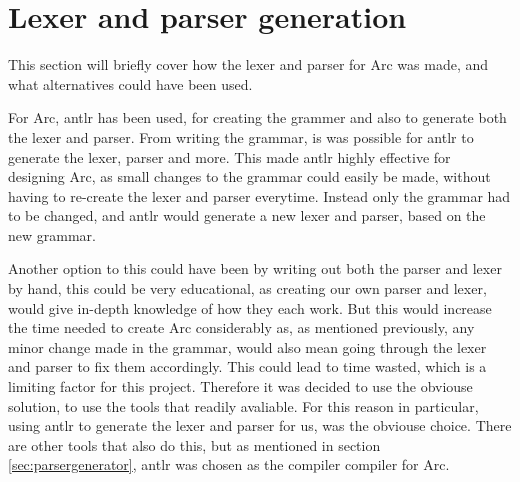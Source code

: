 \section{Lexer and parser generation}

This section will briefly cover how the lexer and parser for Arc was made, and what alternatives could have been used.

For Arc, \gls{antlr} has been used, for creating the grammer and also to generate both the lexer and parser. From writing the grammar, is was possible for \gls{antlr} to generate the lexer, parser and more.\cite{Parr2014} This made \gls{antlr} highly effective for designing Arc, as small changes to the grammar could easily be made, without having to re-create the lexer and parser everytime. Instead only the grammar had to be changed, and \gls{antlr} would generate a new lexer and parser, based on the new grammar.


Another option to this could have been by writing out both the parser and lexer by hand, this could be very educational, as creating our own parser and lexer, would give in-depth knowledge of how they each work. But this would increase the time needed to create Arc considerably as, as mentioned previously, any minor change made in the grammar, would also mean going through the lexer and parser to fix them accordingly. This could lead to time wasted, which is a limiting factor for this project. Therefore it was decided to use the obviouse solution, to use the tools that readily avaliable. For this reason in particular, using \gls{antlr} to generate the lexer and parser for us, was the obviouse choice. There are other tools that also do this, but as mentioned in section \ref*{sec:parsergenerator}, \gls{antlr} was chosen as the compiler compiler for Arc.




